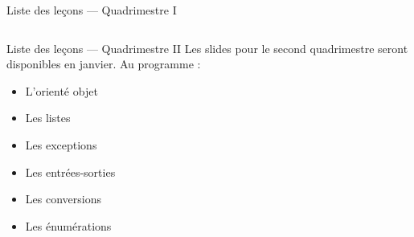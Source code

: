 \begin{frame}{Liste des le\c cons --- Quadrimestre I}
\begin{columns}[T]
\begin{column}{0.45\textwidth}
  \vspace{-15pt}
  \tableofcontents[hideallsubsections,sections={18}]
  \vspace{-15pt}
  \tableofcontents[hideallsubsections,sections={19}]
  \vspace{-15pt}
  \tableofcontents[hideallsubsections,sections={20}]
  \vspace{-15pt}
  \tableofcontents[hideallsubsections,sections={21}]
  \vspace{-15pt}
  \tableofcontents[hideallsubsections,sections={22}]
  \vspace{-15pt}
  \tableofcontents[hideallsubsections,sections={23}]
  \end{column}
\end{columns}
\end{frame}

\begin{frame}{Liste des le\c cons --- Quadrimestre II}
Les slides pour le second quadrimestre seront disponibles en janvier.
Au programme :
\begin{itemize}
\item L'orient\'e objet
\item Les listes
\item Les exceptions
\item Les entr\'ees-sorties
\item Les conversions
\item Les \'enum\'erations
\end{itemize}
\end{frame}


